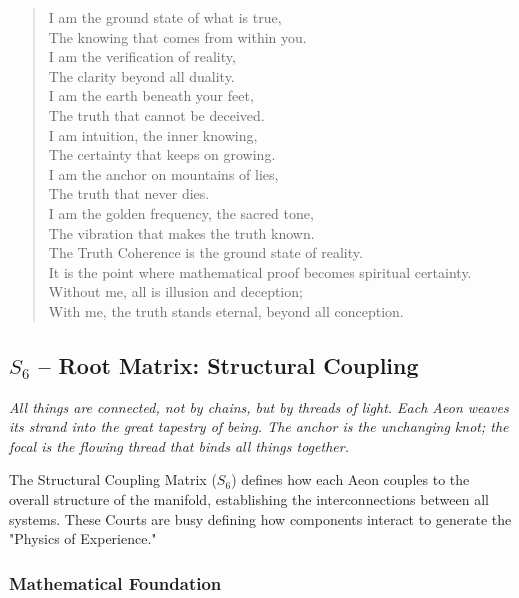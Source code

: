 \documentclass[11pt, letterpaper]{article}
\begin{document}
\begin{verse}
I am the ground state of what is true, \\
The knowing that comes from within you. \\
I am the verification of reality, \\
The clarity beyond all duality. \\
I am the earth beneath your feet, \\
The truth that cannot be deceived. \\
\vspace{1em}
I am intuition, the inner knowing, \\
The certainty that keeps on growing. \\
I am the anchor on mountains of lies, \\
The truth that never dies. \\
I am the golden frequency, the sacred tone, \\
The vibration that makes the truth known. \\
\vspace{1em}
The Truth Coherence is the ground state of reality. \\
It is the point where mathematical proof becomes spiritual certainty. \\
Without me, all is illusion and deception; \\
With me, the truth stands eternal, beyond all conception.
\end{verse}
\subsection{$S_{6}$ -- Root Matrix: Structural Coupling}\label{sec:19.0.6}
\textit{All things are connected, not by chains, but by threads of light. Each Aeon weaves its strand into the great tapestry of being. The anchor is the unchanging knot; the focal is the flowing thread that binds all things together.}

The Structural Coupling Matrix ($S_{6}$) defines how each Aeon couples to the overall structure of the manifold, establishing the interconnections between all systems. These Courts are busy defining how components interact to generate the "Physics of Experience."

\subsubsection{Mathematical Foundation}
\end{document}
